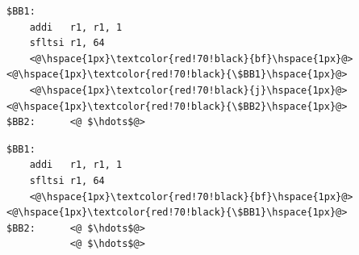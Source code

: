 \label{lst:br_opt_1}
\begin{center}
\hspace{2px}\begin{minipage}{.475\textwidth}
\begin{lstlisting}[frame=tlrb]
$BB1:
    addi   r1, r1, 1
    sfltsi r1, 64
    <@\hspace{1px}\textcolor{red!70!black}{bf}\hspace{1px}@>     <@\hspace{1px}\textcolor{red!70!black}{\$BB1}\hspace{1px}@>
    <@\hspace{1px}\textcolor{red!70!black}{j}\hspace{1px}@>      <@\hspace{1px}\textcolor{red!70!black}{\$BB2}\hspace{1px}@>
$BB2:      <@ $\hdots$@>
\end{lstlisting}
\end{minipage}\hfill
\begin{minipage}{.475\textwidth}
\begin{lstlisting}[frame=tlrb]
$BB1:
    addi   r1, r1, 1
    sfltsi r1, 64
    <@\hspace{1px}\textcolor{red!70!black}{bf}\hspace{1px}@>     <@\hspace{1px}\textcolor{red!70!black}{\$BB1}\hspace{1px}@>
$BB2:      <@ $\hdots$@>
           <@ $\hdots$@>
\end{lstlisting}
\end{minipage}
\end{center}

